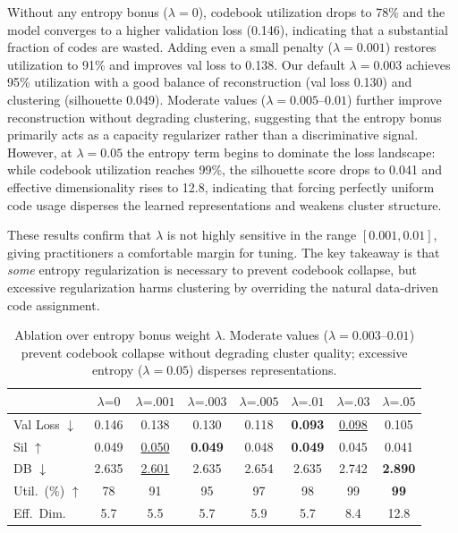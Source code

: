 \documentclass[pmlr]{jmlr}%
\newcommand{\best}[1]{\textbf{#1}}
\newcommand{\second}[1]{\underline{#1}}
\begin{document}
Without any entropy bonus ($\lambda = 0$), codebook utilization drops to 78\% and the model converges to a higher validation loss (0.146), indicating that a substantial fraction of codes are wasted. Adding even a small penalty ($\lambda = 0.001$) restores utilization to 91\% and improves val loss to 0.138. Our default $\lambda = 0.003$ achieves 95\% utilization with a good balance of reconstruction (val loss 0.130) and clustering (silhouette 0.049). Moderate values ($\lambda = 0.005$--$0.01$) further improve reconstruction without degrading clustering, suggesting that the entropy bonus primarily acts as a capacity regularizer rather than a discriminative signal. However, at $\lambda = 0.05$ the entropy term begins to dominate the loss landscape: while codebook utilization reaches 99\%, the silhouette score drops to 0.041 and effective dimensionality rises to 12.8, indicating that forcing perfectly uniform code usage disperses the learned representations and weakens cluster structure.

These results confirm that $\lambda$ is not highly sensitive in the range $[0.001, 0.01]$, giving practitioners a comfortable margin for tuning. The key takeaway is that \emph{some} entropy regularization is necessary to prevent codebook collapse, but excessive regularization harms clustering by overriding the natural data-driven code assignment.

\begin{table}[t]
  \centering
  \caption{Ablation over entropy bonus weight $\lambda$. Moderate values ($\lambda{=}0.003$--$0.01$) prevent codebook collapse without degrading cluster quality; excessive entropy ($\lambda{=}0.05$) disperses representations.}
  \label{tab:ablation_entropy}
  \small
  \begin{tabular}{lccccccc}
  \toprule
  & $\lambda\text{=}0$ & $\lambda\text{=}.001$ & $\lambda\text{=}.003$ & $\lambda\text{=}.005$ & $\lambda\text{=}.01$ & $\lambda\text{=}.03$ & $\lambda\text{=}.05$ \\
  \midrule
  Val Loss $\downarrow$ & 0.146 & 0.138 & 0.130 & 0.118 & \best{0.093} & \second{0.098} & 0.105 \\
  Sil $\uparrow$ & 0.049 & \second{0.050} & \best{0.049} & 0.048 & \best{0.049} & 0.045 & 0.041 \\
  DB $\downarrow$ & 2.635 & \second{2.601} & 2.635 & 2.654 & 2.635 & 2.742 & \best{2.890} \\
  Util.\ (\%) $\uparrow$ & 78 & 91 & 95 & 97 & 98 & 99 & \best{99} \\
  Eff.\ Dim. & 5.7 & 5.5 & 5.7 & 5.9 & 5.7 & 8.4 & 12.8 \\
  \bottomrule
  \end{tabular}
\end{table}
\end{document}

